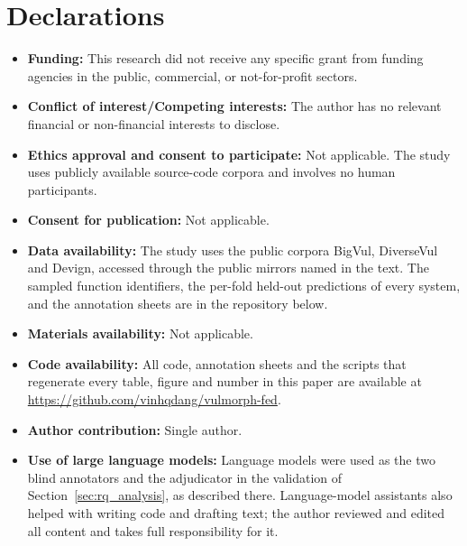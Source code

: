 \documentclass[pdflatex,sn-basic]{sn-jnl}
\theoremstyle{thmstyleone}%
\begin{document}

\section*{Declarations}

\begin{itemize}
\item \textbf{Funding:} This research did not receive any specific grant from funding agencies in the public, commercial, or not-for-profit sectors.
\item \textbf{Conflict of interest/Competing interests:} The author has no relevant financial or non-financial interests to disclose.
\item \textbf{Ethics approval and consent to participate:} Not applicable. The study uses publicly available source-code corpora and involves no human participants.
\item \textbf{Consent for publication:} Not applicable.
\item \textbf{Data availability:} The study uses the public corpora BigVul, DiverseVul and Devign, accessed through the public mirrors named in the text. The sampled function identifiers, the per-fold held-out predictions of every system, and the annotation sheets are in the repository below.
\item \textbf{Materials availability:} Not applicable.
\item \textbf{Code availability:} All code, annotation sheets and the scripts that regenerate every table, figure and number in this paper are available at \url{https://github.com/vinhqdang/vulmorph-fed}.
\item \textbf{Author contribution:} Single author.
\item \textbf{Use of large language models:} Language models were used as the two blind annotators and the adjudicator in the validation of Section~\ref{sec:rq_analysis}, as described there. Language-model assistants also helped with writing code and drafting text; the author reviewed and edited all content and takes full responsibility for it.
\end{itemize}


\end{document}
